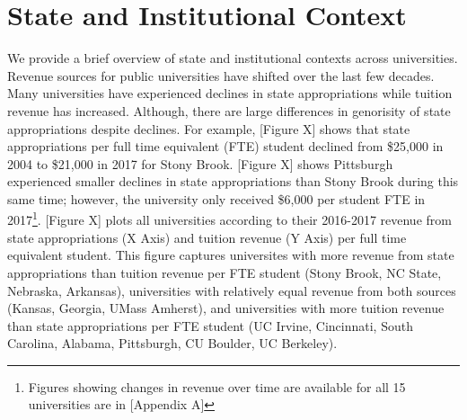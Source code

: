 \documentclass[twoside]{article}
\begin{document}
\section*{State and Institutional Context}
We provide a brief overview of state and institutional contexts across universities. Revenue sources for public universities have shifted over the last few decades. Many universities have experienced declines in state appropriations while tuition revenue has increased. Although, there are large differences in genorisity of state appropriations despite declines. For example, [Figure X] shows that state appropriations per full time equivalent (FTE) student declined from \$25,000 in 2004 to \$21,000 in 2017 for Stony Brook. [Figure X] shows Pittsburgh experienced smaller declines in state appropriations than Stony Brook during this same time; however, the university only received \$6,000 per student FTE in 2017\footnote{Figures showing changes in revenue over time are available for all 15 universities are in [Appendix A]}. [Figure X] plots all universities according to their 2016-2017 revenue from state appropriations (X Axis) and tuition revenue (Y Axis) per full time equivalent student. This figure captures universites with more revenue from state appropriations than tuition revenue per FTE student (Stony Brook, NC State, Nebraska, Arkansas), universities with relatively equal revenue from both sources (Kansas, Georgia, UMass Amherst), and universities with more tuition revenue than state appropriations per FTE student (UC Irvine, Cincinnati, South Carolina, Alabama, Pittsburgh, CU Boulder, UC Berkeley).
\end{document}
